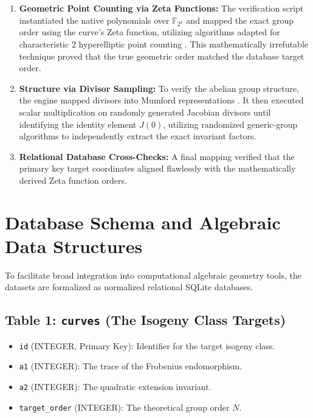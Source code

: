 \documentclass[12pt]{article}
\begin{document}
\begin{enumerate}
    \item \textbf{Geometric Point Counting via Zeta Functions:} The verification script instantiated the native polynomials over $\mathbb{F}_{2^k}$ and mapped the exact group order using the curve's Zeta function, utilizing algorithms adapted for characteristic 2 hyperelliptic point counting \cite{Denef2006}. This mathematically irrefutable technique proved that the true geometric order matched the database target order.
    \item \textbf{Structure via Divisor Sampling:} To verify the abelian group structure, the engine mapped divisors into Mumford representations \cite{Cantor1987}. It then executed scalar multiplication on randomly generated Jacobian divisors until identifying the identity element $J(0)$, utilizing randomized generic-group algorithms \cite{Sutherland2007} to independently extract the exact invariant factors.
    \item \textbf{Relational Database Cross-Checks:} A final mapping verified that the primary key target coordinates aligned flawlessly with the mathematically derived Zeta function orders.
\end{enumerate}

\section{Database Schema and Algebraic Data Structures}
To facilitate broad integration into computational algebraic geometry tools, the datasets are formalized as normalized relational SQLite databases. 

\subsection{Table 1: \texttt{curves} (The Isogeny Class Targets)}
\begin{itemize}
    \item \texttt{id} (INTEGER, Primary Key): Identifier for the target isogeny class.
    \item \texttt{a1} (INTEGER): The trace of the Frobenius endomorphism.
    \item \texttt{a2} (INTEGER): The quadratic extension invariant.
    \item \texttt{target\_order} (INTEGER): The theoretical group order $N$.
\end{itemize}
\end{document}
